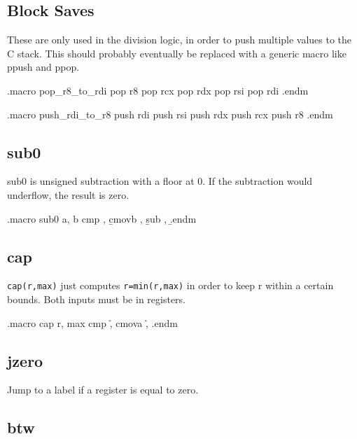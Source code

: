 \subsection{Block Saves}

These are only used in the division logic, in order to push multiple
values to the C stack.  This should probably eventually be replaced with
a generic macro like ppush and ppop.

\begin{asm}
.macro pop_r8_to_rdi
	pop	r8
	pop	rcx
	pop	rdx
	pop	rsi
	pop	rdi
.endm
\end{asm}

\begin{asm}
.macro push_rdi_to_r8
	push	rdi
	push	rsi
	push	rdx
	push	rcx
	push	r8
.endm
\end{asm}

\subsection{sub0}

sub0 is unsigned subtraction with a floor at 0.  If the subtraction
would underflow, the result is zero.

\begin{asm}
.macro sub0 a, b
	cmp	\a, \b
	cmovb	\a, \b
	sub	\a, \b
.endm
\end{asm}

\subsection{cap}

\lstinline|cap(r,max)| just computes \lstinline|r=min(r,max)| in order
to keep r within a certain bounds.  Both inputs must be in registers.

\begin{asm}
.macro cap r, max
	cmp	\r, \max
	cmova	\r, \max
.endm
\end{asm}

\subsection{jzero}

Jump to a label if a register is equal to zero.


\subsection{btw}

